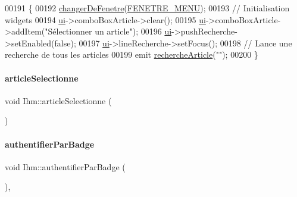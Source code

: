 \begin{DoxyCode}
00191 \{
00192     \hyperlink{class_ihm_ab33d5d0a85d60a8d41bae11c34435d50}{changerDeFenetre}(\hyperlink{_ihm_8h_a280ed5a4ea1cf0cd4c224443fa33db12aab522f0c9f0507be961991070788221f}{FENETRE\_MENU});
00193     \textcolor{comment}{// Initialisation widgets}
00194     \hyperlink{class_ihm_a0ac5f47856566ceeeca1720109bf70ea}{ui}->comboBoxArticle->clear();
00195     \hyperlink{class_ihm_a0ac5f47856566ceeeca1720109bf70ea}{ui}->comboBoxArticle->addItem(\textcolor{stringliteral}{"Sélectionner un article"});
00196     \hyperlink{class_ihm_a0ac5f47856566ceeeca1720109bf70ea}{ui}->pushRecherche->setEnabled(\textcolor{keyword}{false});
00197     \hyperlink{class_ihm_a0ac5f47856566ceeeca1720109bf70ea}{ui}->lineRecherche->setFocus();
00198     \textcolor{comment}{// Lance une recherche de tous les articles}
00199     emit \hyperlink{class_ihm_a3805ec42b0de42e9210b9561b08f3ecd}{rechercheArticle}(\textcolor{stringliteral}{""});
00200 \}
\end{DoxyCode}
\mbox{\label{class_ihm_aef14440b8cc3c9ec92289199ecb7c32f}} 
\paragraph{\texorpdfstring{article\+Selectionne}{articleSelectionne}}
{\footnotesize\ttfamily void Ihm\+::article\+Selectionne (\begin{DoxyParamCaption}\item[{Q\+String}]{ }\end{DoxyParamCaption})\hspace{0.3cm}{\ttfamily [signal]}}

\mbox{\label{class_ihm_abf037b73a8416097f768dd6eb7e20e0e}} 
\paragraph{\texorpdfstring{authentifier\+Par\+Badge}{authentifierParBadge}}
{\footnotesize\ttfamily void Ihm\+::authentifier\+Par\+Badge (\begin{DoxyParamCaption}{ }\end{DoxyParamCaption})\hspace{0.3cm}{\ttfamily [private]}, {\ttfamily [slot]}}



